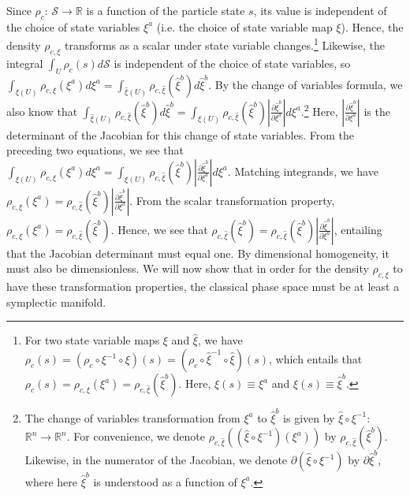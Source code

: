 \documentclass[letterpaper]{article}
\begin{document}
Since $\rho_c$: $\mathcal{S} \to \mathbb{R}$ is a function of the particle state $s$, its value is independent of the choice of state variables $\xi^a$ (i.e. the choice of state variable map $\xi$). Hence, the density $\rho_{c, \xi}$ transforms as a scalar under state variable changes.\footnote{For two state variable maps $\xi$ and $\hat{\xi}$, we have $\rho_c(s) = (\rho_c \circ \xi^{-1} \circ \xi)(s) = (\rho_c \circ \hat{\xi}^{-1} \circ \hat{\xi})(s)$, which entails that $\rho_c(s) = \rho_{c, \xi} (\xi^a) = \rho_{c, \hat{\xi}} (\hat{\xi}^b)$. Here, $\xi(s) \equiv \xi^a$ and $\hat{\xi}(s) \equiv \hat{\xi}^b$.} Likewise, the integral $\int_U \rho_c(s) d\mathcal{S} $ is independent of the choice of state variables, so $\int_{\xi(U)} \rho_{c, \xi} (\xi^a) d \xi^a = \int_{\hat{\xi}(U)} \rho_{c, \hat{\xi}} (\hat{\xi}^b) d \hat{\xi}^b$. By the change of variables formula, we also know that $\int_{\hat{\xi}(U)} \rho_{c, \hat{\xi}} (\hat{\xi}^b) d \hat{\xi}^b= \int_{\xi(U)} \rho_{c, \hat{\xi}} (\hat{\xi}^b) \left|\frac{\partial \hat{\xi}^b}{\partial \xi^a} \right|  d \xi^a$.\footnote{The change of variables transformation from $\xi^a$ to $\hat{\xi}^b$ is given by $\hat{\xi} \circ \xi^{-1}$: $\mathbb{R}^n \to \mathbb{R}^n $. For convenience, we denote $\rho_{c, \hat{\xi}} ((\hat{\xi} \circ \xi^{-1})(\xi^a))$ by $\rho_{c, \hat{\xi}} (\hat{\xi}^b)$. Likewise, in the numerator of the Jacobian, we denote $\partial(\hat{\xi} \circ \xi^{-1})$ by $\partial \hat{\xi}^b$, where here $\hat{\xi}^b$ is understood as a function of $\xi^a$.} Here, $ \left|\frac{\partial \hat{\xi}^b}{\partial \xi^a} \right|$ is the determinant of the Jacobian for this change of state variables. From the preceding two equations, we see that $\int_{\xi(U)} \rho_{c, \xi} (\xi^a) d \xi^a = \int_{\xi(U)} \rho_{c, \hat{\xi}} (\hat{\xi}^b) \left|\frac{\partial \hat{\xi}^b}{\partial \xi^a} \right|  d \xi^a$. Matching integrands, we have $\rho_{c, \xi} (\xi^a) = \rho_{c, \hat{\xi}} (\hat{\xi}^b) \left|\frac{\partial \hat{\xi}^b}{\partial \xi^a} \right|$. From the scalar transformation property, $\rho_{c, \xi} (\xi^a) = \rho_{c, \hat{\xi}} (\hat{\xi}^b)$. Hence, we see that $\rho_{c, \hat{\xi}} (\hat{\xi}^b) =  \rho_{c, \hat{\xi}} (\hat{\xi}^b) \left|\frac{\partial \hat{\xi}^b}{\partial \xi^a} \right|$, entailing that the Jacobian determinant must equal one. By dimensional homogeneity, it must also be dimensionless. We will now show that in order for the density $\rho_{c, \xi}$ to have these transformation properties, the classical phase space must be at least a symplectic manifold. 
\end{document}
